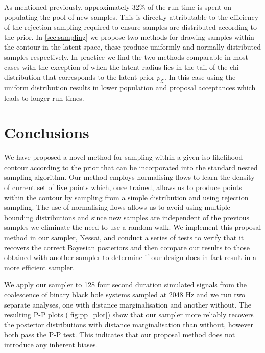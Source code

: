 \documentclass[%
 reprint,
nofootinbib,
 amsmath,amssymb,
 aps,
 prd,
]{revtex4-2}
\newcommand{\latent}{\mathcal{Z}}
\newcommand{\nessai}{{\sc Nessai}\xspace}
\begin{document}
As mentioned previously, approximately 32\% of the run-time is spent on populating the pool of new samples. This is directly attributable to the efficiency of the rejection sampling required to ensure samples are distributed according to the prior. In \cref{sec:sampling} we propose two methods for drawing samples within the contour in the latent space, these produce uniformly and normally distributed samples respectively. In practice we find the two methods comparable in most cases with the exception of when the latent radius lies in the tail of the chi-distribution that corresponds to the latent prior $p_{\latent}$. In this case using the uniform distribution results in lower population and proposal acceptances which leads to longer run-times.

\section{Conclusions}\label{sec:conclusion}

We have proposed a novel method for sampling within a given iso-likelihood contour according to the prior that can be incorporated into the standard nested sampling algorithm. Our method employs normalising flows to learn the density of current set of live points which, once trained, allows us to produce points within the contour by sampling from a simple distribution and using rejection sampling. The use of normalising flows allows us to avoid using multiple bounding distributions and since new samples are independent of the previous samples we eliminate the need to use a random walk. We implement this proposal method in our sampler, \nessai, and conduct a series of tests to verify that it recovers the correct Bayesian posteriors and then compare our results to those obtained with another sampler to determine if our design does in fact result in a more efficient sampler.

We apply our sampler to 128 four second duration simulated signals from the coalescence of binary black hole systems sampled at 2048 Hz and we run two separate analyses, one with distance marginalisation and another without. The resulting P-P plots (\cref{fig:pp_plot}) show that our sampler more reliably recovers the posterior distributions with distance marginalisation than without, however both pass the P-P test. This indicates that our proposal method does not introduce any inherent biases.
\end{document}
